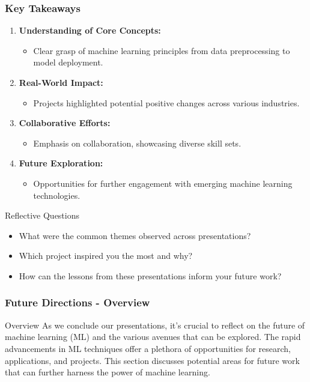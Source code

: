\documentclass[aspectratio=169]{beamer}
\begin{document}
\begin{frame}[fragile]
    \frametitle{Key Takeaways}
    \begin{enumerate}
        \item \textbf{Understanding of Core Concepts:}
            \begin{itemize}
                \item Clear grasp of machine learning principles from data preprocessing to model deployment.
            \end{itemize}
        
        \item \textbf{Real-World Impact:}
            \begin{itemize}
                \item Projects highlighted potential positive changes across various industries.
            \end{itemize}
        
        \item \textbf{Collaborative Efforts:}
            \begin{itemize}
                \item Emphasis on collaboration, showcasing diverse skill sets.
            \end{itemize}
        
        \item \textbf{Future Exploration:}
            \begin{itemize}
                \item Opportunities for further engagement with emerging machine learning technologies.
            \end{itemize}
    \end{enumerate}
    
    \begin{block}{Reflective Questions}
        \begin{itemize}
            \item What were the common themes observed across presentations?
            \item Which project inspired you the most and why?
            \item How can the lessons from these presentations inform your future work?
        \end{itemize}
    \end{block}
\end{frame}

\begin{frame}[fragile]
    \frametitle{Future Directions - Overview}
    \begin{block}{Overview}
        As we conclude our presentations, it's crucial to reflect on the future of machine learning (ML) and the various avenues that can be explored. 
        The rapid advancements in ML techniques offer a plethora of opportunities for research, applications, and projects. 
        This section discusses potential areas for future work that can further harness the power of machine learning.
    \end{block}
\end{frame}
\end{document}
